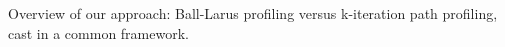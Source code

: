 \label{fig:kblpp-approach} Overview of our approach: Ball-Larus profiling versus k-iteration path profiling, cast in a common framework.
